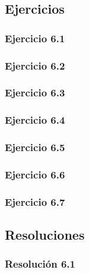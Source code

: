 \subsection{Ejercicios}

\subsubsection{Ejercicio 6.1}


\subsubsection{Ejercicio 6.2}


\subsubsection{Ejercicio 6.3}


\subsubsection{Ejercicio 6.4}


\subsubsection{Ejercicio 6.5}


\subsubsection{Ejercicio 6.6}


\subsubsection{Ejercicio 6.7}


\subsection{Resoluciones}

\subsubsection{Resolución 6.1}


